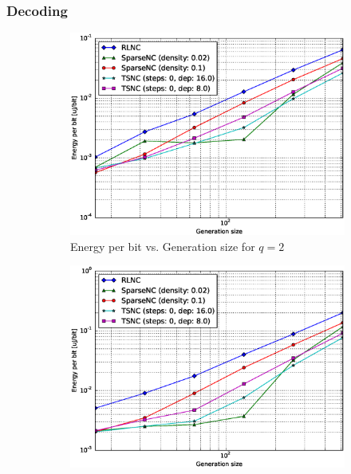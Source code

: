 \subsubsection{Decoding}

\begin{figure}
    \centering
    \begin{subfigure}[b]{0.475\textwidth}
        \centering
        \includegraphics[width=1.1\textwidth]{images/23_07_2015/energy_per_bit_vs_generation_size_Rasp_Binary_decoder_1600.eps}
        \caption[]%
        {{\small Energy per bit vs. Generation size for $q = 2$}}    
        \label{fig:dec_ene_rasp1_gen_gf2}
    \end{subfigure}
    \hfill
    \begin{subfigure}[b]{0.475\textwidth}  
        \centering 
        \includegraphics[width=1.1\textwidth]{images/23_07_2015/energy_per_bit_vs_generation_size_Rasp_Binary8_decoder_1600.eps}

\end{subfigure}
\end{figure}
